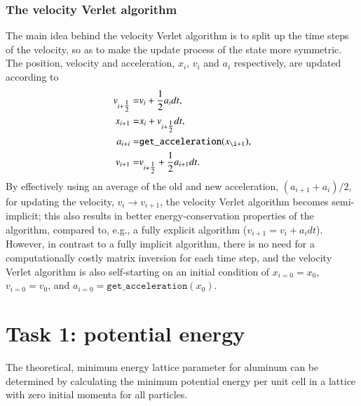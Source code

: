 \subsubsection*{The velocity Verlet algorithm}
The main idea behind the velocity Verlet algorithm is to split up the time steps of the velocity, so as to make the update process of the state more symmetric. The position, velocity and acceleration, $x_i$, $v_i$ and $a_i$\footnotemark{} respectively, are updated according to
\begin{equation}
\begin{aligned}
v_{i+\tfrac{1}{2}}=& v_{i}+\frac{1}{2}a_{i}dt,\\
x_{i+1} =& x_{i} + v_{i+\tfrac{1}{2}}dt,\\
a_{i+i} =& \mathtt{get\_acceleration}(x_{\i+1}),\\
v_{i+1} =& v_{i+\tfrac{1}{2}} + \frac{1}{2}a_{i+1}dt.\\
\end{aligned}
\end{equation}
By effectively using an average of the old and new acceleration, $(a_{i+1}+a_{i})/2$, for updating the velocity, $v_{i}\to v_{i+1}$, the velocity Verlet algorithm becomes semi-implicit; this also results in better energy-conservation properties of the algorithm, compared to, e.g., a fully explicit algorithm ($v_{i+1}=v_{i}+a_{i}dt$). However, in contrast to a fully implicit algorithm, there is no need for a computationally costly matrix inversion for each time step, and the velocity Verlet algorithm is also self-starting on an initial condition of $x_{i=0}=x_0$, $v_{i=0}=v_0$, and $a_{i=0}=\mathtt{get\_acceleration}(x_{0})$.



\section*{Task 1: potential energy}
The theoretical, minimum energy lattice parameter for aluminum can be determined by calculating the minimum potential energy per unit cell in a lattice with zero initial momenta for all particles. 

